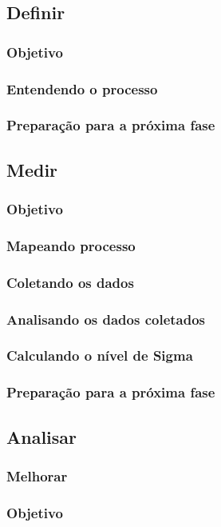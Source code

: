 \documentclass{abnt}
\begin{document}
				\subsection {Definir}
					\subsubsection {Objetivo}
					\subsubsection {Entendendo o processo}
					\subsubsection {Preparação para a próxima fase}
				\subsection {Medir}
					\subsubsection {Objetivo}
					\subsubsection {Mapeando processo}
					\subsubsection {Coletando os dados}
					\subsubsection {Analisando os dados coletados}
					\subsubsection {Calculando o nível de Sigma}
					\subsubsection {Preparação para a próxima fase}
				\subsection {Analisar}
					\subsubsection {Melhorar}
					\subsubsection {Objetivo}
\end{document}
